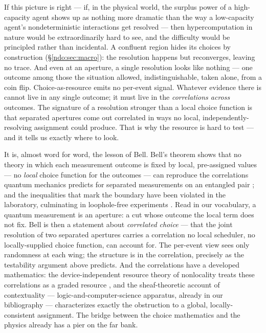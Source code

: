 If this picture is right --- if, in the physical world, the surplus power of a high-capacity
agent shows up as nothing more dramatic than the way a low-capacity agent's nondeterministic
interactions get resolved --- then hypercomputation in nature would be extraordinarily hard to
see, and the difficulty would be principled rather than incidental. A confluent region hides
its choices by construction (\S\ref{ndo:sec:macro}): the resolution happens but reconverges,
leaving no trace. And even at an aperture, a single resolution looks like nothing --- one
outcome among those the situation allowed, indistinguishable, taken alone, from a coin flip.
Choice-as-resource emits no per-event signal. Whatever evidence there is cannot live in any
single outcome; it must live in the \emph{correlations across} outcomes. The signature of a
resolution stronger than a local choice function is that separated apertures come out
correlated in ways no local, independently-resolving assignment could produce. That is why the
resource is hard to test --- and it tells us exactly where to look.

It is, almost word for word, the lesson of Bell. Bell's theorem shows that no theory in which
each measurement outcome is fixed by local, pre-assigned values --- no \emph{local} choice
function for the outcomes --- can reproduce the correlations quantum mechanics predicts for
separated measurements on an entangled pair \cite{bell}; and the inequalities that mark the
boundary have been violated in the laboratory, culminating in loophole-free experiments
\cite{hensen}. Read in our vocabulary, a quantum measurement is an aperture: a cut whose
outcome the local term does not fix. Bell is then a statement about \emph{correlated choice} ---
that the joint resolution of two separated apertures carries a correlation no local scheduler,
no locally-supplied choice function, can account for. The per-event view sees only randomness
at each wing; the structure is in the correlation, precisely as the testability argument above
predicts. And the correlations have a developed mathematics: the device-independent resource
theory of nonlocality treats these correlations as a graded resource \cite{brunner}, and the
sheaf-theoretic account of contextuality \cite{abramsky} --- logic-and-computer-science
apparatus, already in our bibliography --- characterizes exactly the obstruction to a global,
locally-consistent assignment. The bridge between the choice mathematics and the physics already
has a pier on the far bank.

